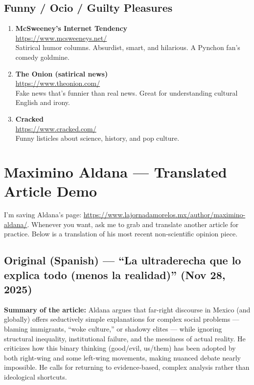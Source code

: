 \documentclass[11pt,a4paper]{article}
\begin{document}
\subsection{Funny / Ocio / Guilty Pleasures}
\begin{enumerate}[label=\textbf{\arabic*.}]
    \item \textbf{McSweeney's Internet Tendency} \\
          \url{https://www.mcsweeneys.net/} \\
          Satirical humor columns. Absurdist, smart, and hilarious. 
          A Pynchon fan's comedy goldmine.
    \item \textbf{The Onion (satirical news)} \\
          \url{https://www.theonion.com/} \\
          Fake news that's funnier than real news. Great for 
          understanding cultural English and irony.
    \item \textbf{Cracked} \\
          \url{https://www.cracked.com/} \\
          Funny listicles about science, history, and pop culture.
\end{enumerate}

\newpage
\section{Maximino Aldana --- Translated Article Demo}

\begin{tcolorbox}[colback=blue!5!white, colframe=blue!50!black, 
    title=\textbf{NOTE}]
I'm saving Aldana's page: \url{https://www.lajornadamorelos.mx/author/maximino-aldana/}. 
Whenever you want, ask me to grab and translate another article for practice. 
Below is a translation of his most recent non-scientific opinion piece.
\end{tcolorbox}

\subsection{Original (Spanish) --- ``La ultraderecha que lo explica todo 
(menos la realidad)'' (Nov 28, 2025)}

\begin{tcolorbox}[colback=gray!5!white, colframe=gray!60!black]
\small
\textbf{Summary of the article:} Aldana argues that far-right discourse in Mexico 
(and globally) offers seductively simple explanations for complex social problems 
--- blaming immigrants, ``woke culture,'' or shadowy elites --- while ignoring 
structural inequality, institutional failure, and the messiness of actual reality. 
He criticizes how this binary thinking (good/evil, us/them) has been adopted by 
both right-wing and some left-wing movements, making nuanced debate nearly impossible. 
He calls for returning to evidence-based, complex analysis rather than ideological 
shortcuts.
\end{tcolorbox}
\end{document}
